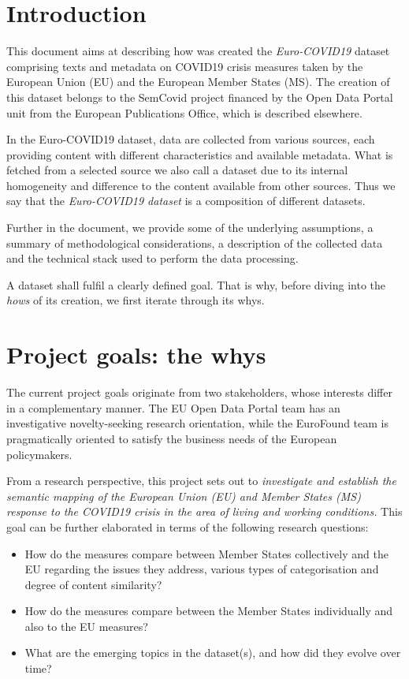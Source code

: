 
\section{Introduction}

This document aims at describing how was created the \textit{Euro-COVID19} dataset comprising texts and metadata on COVID19 crisis measures taken by the European Union (EU) and the European Member States (MS). The creation of this dataset belongs to the SemCovid project financed by the Open Data Portal unit from the European Publications Office, which is described elsewhere. 

In the Euro-COVID19 dataset, data are collected from various sources, each providing content with different characteristics and available metadata. What is fetched from a selected source we also call a dataset due to its internal homogeneity and difference to the content available from other sources. Thus we say that the \textit{Euro-COVID19 dataset} is a composition of different datasets.

Further in the document, we provide some of the underlying assumptions, a summary of methodological considerations, a description of the collected data and the technical stack used to perform the data processing. 

A dataset shall fulfil a clearly defined goal. That is why, before diving into the \textit{hows} of its creation, we first iterate through its whys.

\section{Project goals: the whys}
The current project goals originate from two stakeholders, whose interests differ in a complementary manner. The EU Open Data Portal team has an investigative novelty-seeking research orientation, while the EuroFound team is pragmatically oriented to satisfy the business needs of the European policymakers. 

From a research perspective, this project sets out to \textit{investigate and establish the semantic mapping of the European Union (EU) and Member States (MS) response to the COVID19 crisis in the area of living and working conditions.} This goal can be further elaborated in terms of the following research questions:

\begin{itemize}
	\item How do the measures compare between Member States collectively and the EU regarding the issues they address, various types of categorisation and degree of content similarity?
	\item How do the measures compare between the Member States individually and also to the EU measures? 
	\item What are the emerging topics in the dataset(s), and how did they evolve over time? 
\end{itemize}

